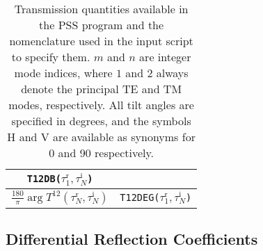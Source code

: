 \documentclass[11pt]{article}
\renewcommand{\inc}{^{\text{i}}}
\renewcommand{\refl}{^{\text{r}}}
\begin{document}
\begin{table}[htbp]
\begin{center}
\begin{tabular}{|c|l|}
        \verb_T12DB(_$\tau_1\refl,\tau_N\inc$\verb_)_ \\ \hline
      $\frac{180}{\pi}\arg{T^{12}(\tau_N\refl,\tau_N\inc)}$ & 
        \verb_T12DEG(_$\tau_1\refl,\tau_N\inc$\verb_)_ \\ \hline
    \end{tabular}
    \caption[Transmission quantities available in the PSS program]%
    {Transmission quantities available in the PSS program and
      the nomenclature used in the input script to specify them. 
      $m$ and $n$ are integer mode indices, where $1$ and $2$ always
      denote the principal TE and TM modes, respectively. All
      tilt angles are specified in degrees, and the symbols
      \textsf{H} and \textsf{V} are available as synonyms
      for \textsf{0}  and \textsf{90} respectively.} 
    \label{tab:trans}
  \end{center}
\end{table}

\cleardoublepage
\newpage


\subsection{Differential Reflection Coefficients}
\end{document}
